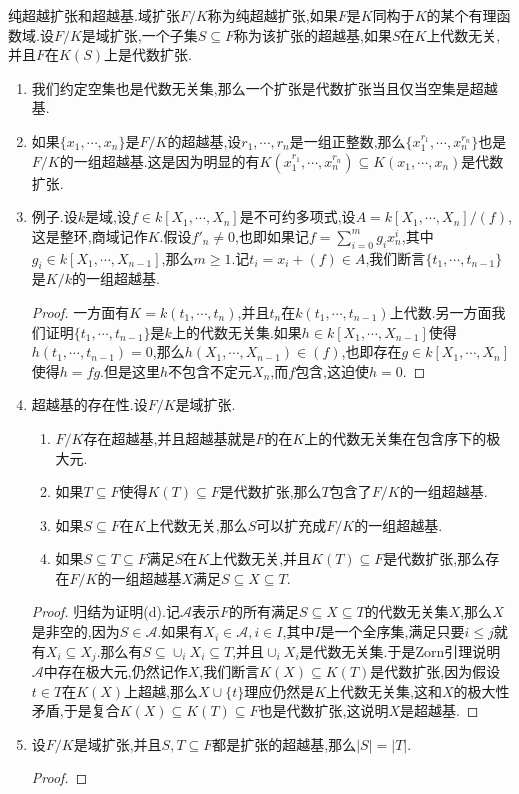 纯超越扩张和超越基.域扩张$F/K$称为纯超越扩张,如果$F$是$K$同构于$K$的某个有理函数域.设$F/K$是域扩张,一个子集$S\subseteq F$称为该扩张的超越基,如果$S$在$K$上代数无关,并且$F$在$K(S)$上是代数扩张.
\begin{enumerate}
	\item 我们约定空集也是代数无关集,那么一个扩张是代数扩张当且仅当空集是超越基.
	\item 如果$\{x_1,\cdots,x_n\}$是$F/K$的超越基,设$r_1,\cdots,r_n$是一组正整数,那么$\{x_1^{r_1},\cdots,x_n^{r_n}\}$也是$F/K$的一组超越基.这是因为明显的有$K(x_1^{r_1},\cdots,x_n^{r_n})\subseteq K(x_1,\cdots,x_n)$是代数扩张.
	\item 例子.设$k$是域,设$f\in k[X_1,\cdots,X_n]$是不可约多项式,设$A=k[X_1,\cdots,X_n]/(f)$,这是整环,商域记作$K$.假设$f'_n\not=0$,也即如果记$f=\sum_{i=0}^mg_ix_n^i$,其中$g_i\in k[X_1,\cdots,X_{n-1}]$,那么$m\ge1$.记$t_i=x_i+(f)\in A$,我们断言$\{t_1,\cdots,t_{n-1}\}$是$K/k$的一组超越基.
	\begin{proof}
		
		一方面有$K=k(t_1,\cdots,t_n)$,并且$t_n$在$k(t_1,\cdots,t_{n-1})$上代数.另一方面我们证明$\{t_1,\cdots,t_{n-1}\}$是$k$上的代数无关集.如果$h\in k[X_1,\cdots,X_{n-1}]$使得$h(t_1,\cdots,t_{n-1})=0$,那么$h(X_1,\cdots,X_{n-1})\in (f)$,也即存在$g\in k[X_1,\cdots,X_n]$使得$h=fg$.但是这里$h$不包含不定元$X_n$,而$f$包含,这迫使$h=0$.
	\end{proof}
    \item 超越基的存在性.设$F/K$是域扩张.
    \begin{enumerate}
    	\item $F/K$存在超越基,并且超越基就是$F$的在$K$上的代数无关集在包含序下的极大元.
    	\item 如果$T\subseteq F$使得$K(T)\subseteq F$是代数扩张,那么$T$包含了$F/K$的一组超越基.
    	\item 如果$S\subseteq F$在$K$上代数无关,那么$S$可以扩充成$F/K$的一组超越基.
    	\item 如果$S\subseteq T\subseteq F$满足$S$在$K$上代数无关,并且$K(T)\subseteq F$是代数扩张,那么存在$F/K$的一组超越基$X$满足$S\subseteq X\subseteq T$.
    \end{enumerate}
    \begin{proof}
    	
    	归结为证明(d).记$\mathscr{A}$表示$F$的所有满足$S\subseteq X\subseteq T$的代数无关集$X$,那么$X$是非空的,因为$S\in\mathscr{A}$.如果有$X_i\in\mathscr{A},i\in I$,其中$I$是一个全序集,满足只要$i\le j$就有$X_i\subseteq X_j$.那么有$S\subseteq\cup_iX_i\subseteq T$,并且$\cup_iX_i$是代数无关集.于是Zorn引理说明$\mathscr{A}$中存在极大元,仍然记作$X$,我们断言$K(X)\subseteq K(T)$是代数扩张,因为假设$t\in T$在$K(X)$上超越,那么$X\cup\{t\}$理应仍然是$K$上代数无关集,这和$X$的极大性矛盾,于是复合$K(X)\subseteq K(T)\subseteq F$也是代数扩张,这说明$X$是超越基.
    \end{proof}
    \item 设$F/K$是域扩张,并且$S,T\subseteq F$都是扩张的超越基,那么$|S|=|T|$.
    \begin{proof}
    	

\end{proof}
\end{enumerate}
